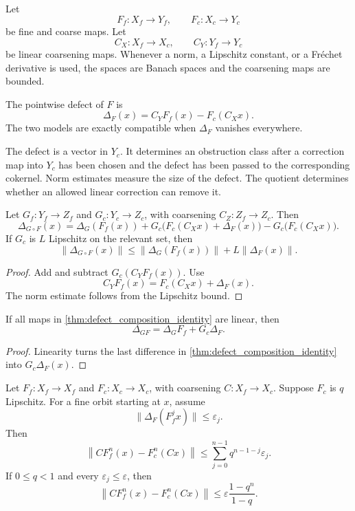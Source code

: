 Let
\[
F_f:X_f\longrightarrow Y_f,
\qquad
F_c:X_c\longrightarrow Y_c
\]
be fine and coarse maps.  Let
\[
C_X:X_f\longrightarrow X_c,
\qquad
C_Y:Y_f\longrightarrow Y_c
\]
be linear coarsening maps.  Whenever a norm, a Lipschitz constant, or a Fr\'echet derivative is used, the spaces are Banach spaces and the coarsening maps are bounded.

\begin{definition}\label{def:nonlinear_defect}
The pointwise defect of $F$ is
\[
\Delta_F(x)
=
C_YF_f(x)-F_c(C_Xx).
\]
The two models are exactly compatible when $\Delta_F$ vanishes everywhere.
\end{definition}


The defect is a vector in $Y_c$.  It determines an obstruction class after a correction map into $Y_c$ has been chosen and the defect has been passed to the corresponding cokernel.  Norm estimates measure the size of the defect.  The quotient determines whether an allowed linear correction can remove it.

\begin{theorem}\label{thm:defect_composition_identity}
Let $G_f:Y_f\to Z_f$ and $G_c:Y_c\to Z_c$, with coarsening $C_Z:Z_f\to Z_c$.  Then
\[
\Delta_{G\circ F}(x)
=
\Delta_G(F_f(x))
+
G_c\big(F_c(C_Xx)+\Delta_F(x)\big)
-
G_c\big(F_c(C_Xx)\big).
\]
If $G_c$ is $L$ Lipschitz on the relevant set, then
\[
\|\Delta_{G\circ F}(x)\|
\le
\|\Delta_G(F_f(x))\|
+
L\|\Delta_F(x)\|.
\]
\end{theorem}

\begin{proof}
Add and subtract $G_c(C_YF_f(x))$.  Use
\[
C_YF_f(x)=F_c(C_Xx)+\Delta_F(x).
\]
The norm estimate follows from the Lipschitz bound.
\end{proof}

\begin{corollary}\label{cor:linear_defect_product}
If all maps in \cref{thm:defect_composition_identity} are linear, then
\[
\Delta_{GF}
=
\Delta_G F_f+G_c\Delta_F.
\]
\end{corollary}

\begin{proof}
Linearity turns the last difference in \cref{thm:defect_composition_identity} into $G_c\Delta_F(x)$.
\end{proof}

\begin{theorem}\label{thm:iterated_orbit_defect}
Let $F_f:X_f\to X_f$ and $F_c:X_c\to X_c$, with coarsening $C:X_f\to X_c$.  Suppose $F_c$ is $q$ Lipschitz.  For a fine orbit starting at $x$, assume
\[
\|\Delta_F(F_f^j x)\|\le\varepsilon_j.
\]
Then
\[
\left\|CF_f^n(x)-F_c^n(Cx)\right\|
\le
\sum_{j=0}^{n-1}q^{n-1-j}\varepsilon_j.
\]
If $0\le q<1$ and every $\varepsilon_j\le\varepsilon$, then
\[
\left\|CF_f^n(x)-F_c^n(Cx)\right\|
\le
\varepsilon\frac{1-q^n}{1-q}.
\]
\end{theorem}

